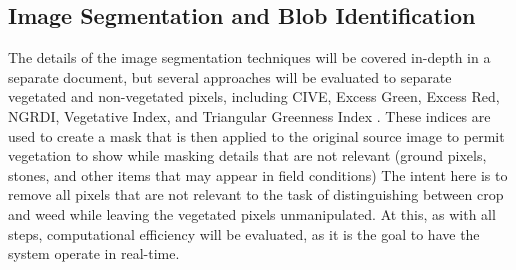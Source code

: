 \documentclass[12pt]{article}
\begin{document}
\subsection{Image Segmentation and Blob Identification}
The details of the image segmentation techniques will be covered in-depth in a separate document, but several approaches will be evaluated to separate vegetated and non-vegetated pixels, including CIVE, Excess Green, Excess Red, NGRDI, Vegetative Index, and Triangular Greenness Index \parencite{Hunt2013-ih,Hamuda2016-dw}. These indices are used to create a mask that is then applied to the original source image to permit vegetation to show while masking details that are not relevant (ground pixels, stones, and other items that may appear in field conditions) The intent here is to remove all pixels that are not relevant to the task of distinguishing between crop and weed while leaving the vegetated pixels unmanipulated. At this, as with all steps, computational efficiency will be evaluated, as it is the goal to have the system operate in real-time.
\end{document}
